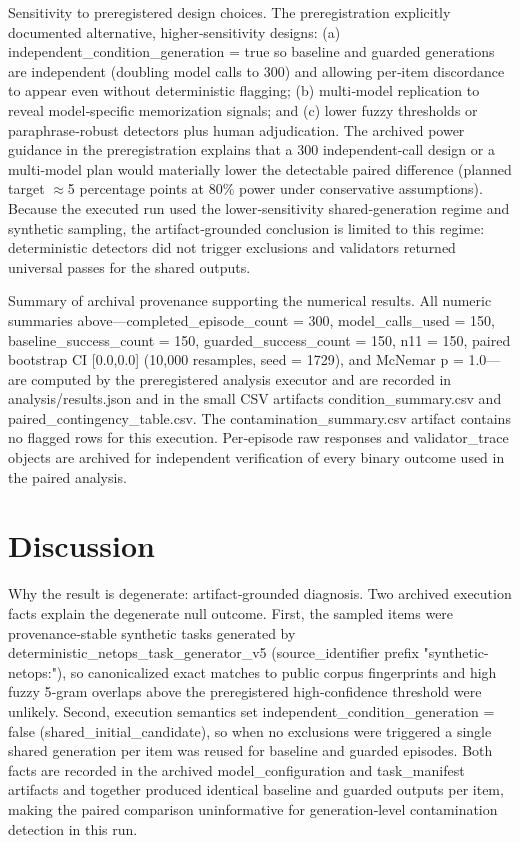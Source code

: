 \documentclass[conference]{IEEEtran}
\begin{document}
Sensitivity to preregistered design choices. The preregistration explicitly documented alternative, higher‑sensitivity designs: (a) independent\_condition\_generation = true so baseline and guarded generations are independent (doubling model calls to 300) and allowing per‑item discordance to appear even without deterministic flagging; (b) multi‑model replication to reveal model‑specific memorization signals; and (c) lower fuzzy thresholds or paraphrase‑robust detectors plus human adjudication. The archived power guidance in the preregistration explains that a 300 independent‑call design or a multi‑model plan would materially lower the detectable paired difference (planned target \ensuremath{\approx}5 percentage points at 80\% power under conservative assumptions). Because the executed run used the lower‑sensitivity shared‑generation regime and synthetic sampling, the artifact‑grounded conclusion is limited to this regime: deterministic detectors did not trigger exclusions and validators returned universal passes for the shared outputs.

Summary of archival provenance supporting the numerical results. All numeric summaries above---completed\_episode\_count = 300, model\_calls\_used = 150, baseline\_success\_count = 150, guarded\_success\_count = 150, n11 = 150, paired bootstrap CI [0.0,0.0] (10,000 resamples, seed = 1729), and McNemar p = 1.0---are computed by the preregistered analysis executor and are recorded in analysis/results.json and in the small CSV artifacts condition\_summary.csv and paired\_contingency\_table.csv. The contamination\_summary.csv artifact contains no flagged rows for this execution. Per‑episode raw responses and validator\_trace objects are archived for independent verification of every binary outcome used in the paired analysis.

\section{Discussion}
Why the result is degenerate: artifact‑grounded diagnosis. Two archived execution facts explain the degenerate null outcome. First, the sampled items were provenance‑stable synthetic tasks generated by deterministic\_netops\_task\_generator\_v5 (source\_identifier prefix "synthetic-netops:"), so canonicalized exact matches to public corpus fingerprints and high fuzzy 5‑gram overlaps above the preregistered high‑confidence threshold were unlikely. Second, execution semantics set independent\_condition\_generation = false (shared\_initial\_candidate), so when no exclusions were triggered a single shared generation per item was reused for baseline and guarded episodes. Both facts are recorded in the archived model\_configuration and task\_manifest artifacts and together produced identical baseline and guarded outputs per item, making the paired comparison uninformative for generation‑level contamination detection in this run.
\end{document}
